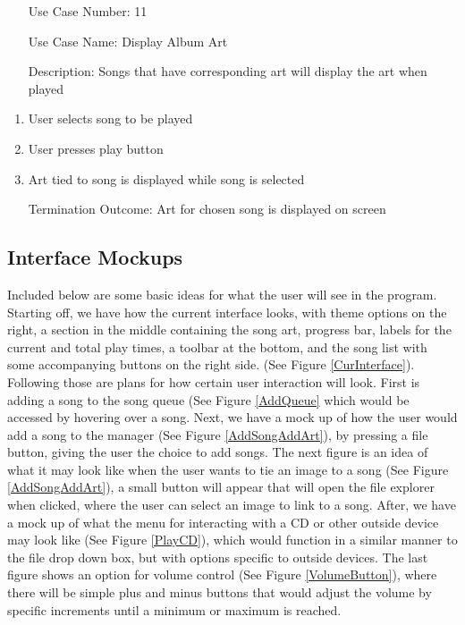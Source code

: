 \documentclass[10pt,conference,onecolumn,compsoc]{IEEEtran}
\begin{document}
\begin{itemize}
\item[Use Case Number:] 11
\item[Use Case Name:] Display Album Art
\item[Description:] Songs that have corresponding art will display the art when played
\end{itemize}

\begin{enumerate}
\item User selects song to be played
\item User presses play button
\item Art tied to song is displayed while song is selected
\item[Termination Outcome:] Art for chosen song is displayed on screen 
\end{enumerate}

\subsection{Interface Mockups}
Included below are some basic ideas for what the user will see in the program. Starting off, we have how the current interface looks, with theme options on the right, a section in the middle containing the song art, progress bar, labels for the current and total play times, a toolbar at the bottom, and the song list with some accompanying buttons on the right side. (See Figure \ref{CurInterface}). Following those are plans for how certain user interaction will look. First is adding a song to the song queue (See Figure \ref{AddQueue} which would be accessed by hovering over a song. Next, we have a mock up of how the user would add a song to the manager (See Figure \ref{AddSongAddArt}), by pressing a file button, giving the user the choice to add songs. The next figure is an idea of what it may look like when the user wants to tie an image to a song (See Figure \ref{AddSongAddArt}), a small button will appear that will open the file explorer when clicked, where the user can select an image to link to a song. After, we have a mock up of what the menu for interacting with a CD or other outside device may look like (See Figure \ref{PlayCD}), which would function in a similar manner to the file drop down box, but with options specific to outside devices. The last figure shows an option for volume control (See Figure \ref{VolumeButton}), where there will be simple plus and minus buttons that would adjust the volume by specific increments until a minimum or maximum is reached.
\end{document}
